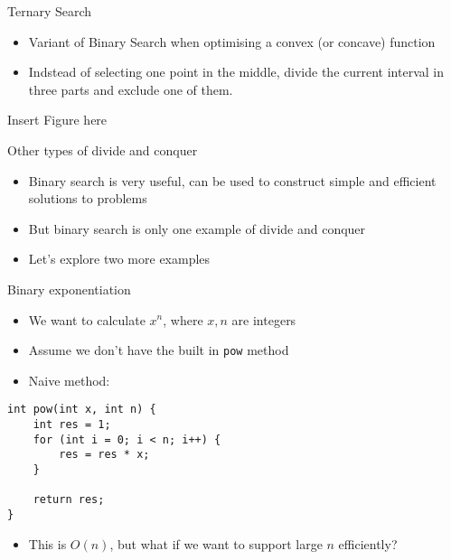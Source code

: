\documentclass[12pt,t]{beamer}
\newcommand{\bi}{\begin{itemize}}
\newcommand{\ei}{\end{itemize}}
\begin{document}
\begin{frame}{Ternary Search}
		\vspace{10pt}
		\bi
			\item Variant of Binary Search when optimising a convex (or concave) function
			\item Indstead of selecting one point in the middle, divide the current interval in three parts and exclude one of them.
		\ei
		\begin{center}
				Insert Figure here
		\end{center}
\end{frame}

\begin{frame}{Other types of divide and conquer}
    \vspace{20pt}
    \bi
        \item Binary search is very useful, can be used to construct simple and efficient solutions to problems
        \item But binary search is only one example of divide and conquer
        \item Let's explore two more examples
    \ei
\end{frame}

\begin{frame}[fragile]{Binary exponentiation}
    \bi
        \item We want to calculate $x^n$, where $x,n$ are integers
        \item Assume we don't have the built in \texttt{pow} method
        \item Naive method:
    \ei

    \begin{verbatim}
int pow(int x, int n) {
    int res = 1;
    for (int i = 0; i < n; i++) {
        res = res * x;
    }

    return res;
}
    \end{verbatim}

    \bi
        \item This is $O(n)$, but what if we want to support large $n$ efficiently?
    \ei
\end{frame}
\end{document}
